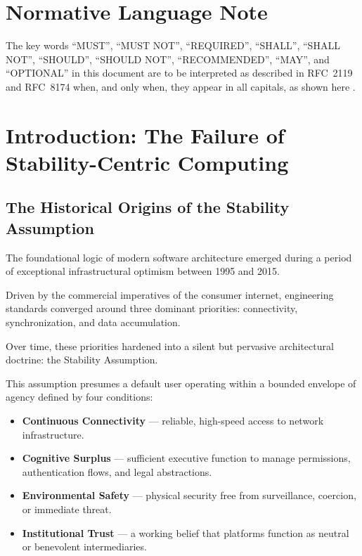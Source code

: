 \documentclass[12pt]{article}
\begin{document}
\section*{Normative Language Note}
The key words ``MUST'', ``MUST NOT'', ``REQUIRED'', ``SHALL'', ``SHALL NOT'', ``SHOULD'', ``SHOULD NOT'', ``RECOMMENDED'', ``MAY'', and ``OPTIONAL'' in this document are to be interpreted as described in RFC~2119 and RFC~8174 when, and only when, they appear in all capitals, as shown here \cite{rfc2119,rfc8174}.

\section{Introduction: The Failure of Stability-Centric Computing}

\subsection{The Historical Origins of the Stability Assumption}
The foundational logic of modern software architecture emerged during a period of exceptional infrastructural optimism between 1995 and 2015.

Driven by the commercial imperatives of the consumer internet, engineering standards converged around three dominant priorities: connectivity, synchronization, and data accumulation.

Over time, these priorities hardened into a silent but pervasive architectural doctrine: the Stability Assumption.

This assumption presumes a default user operating within a bounded envelope of agency defined by four conditions:

\begin{itemize}
\item \textbf{Continuous Connectivity} --- reliable, high-speed access to network infrastructure.
\item \textbf{Cognitive Surplus} --- sufficient executive function to manage permissions, authentication flows, and legal abstractions.
\item \textbf{Environmental Safety} --- physical security free from surveillance, coercion, or immediate threat.
\item \textbf{Institutional Trust} --- a working belief that platforms function as neutral or benevolent intermediaries.
\end{itemize}
\end{document}
